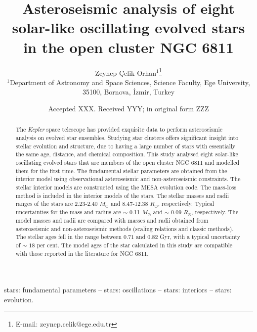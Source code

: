 \documentclass[a4paper,fleqn,usenatbib]{mnras}     %
\title[asteroseismic analysis of open cluster NGC 6811]{Asteroseismic analysis of eight solar-like oscillating evolved stars in the open cluster NGC 6811}
\author[\c{C}elik Orhan, Z.]{
Zeynep \c{C}elik Orhan$^{1}$\thanks{E-mail: zeynep.celik@ege.edu.tr}
\\
$^{1}$Department of Astronomy and Space Sciences, Science Faculty, Ege University, 35100, Bornova, \.{I}zmir, Turkey\\
}
\date{Accepted XXX. Received YYY; in original form ZZZ}
\begin{document}
\label{firstpage}
\pagerange{\pageref{firstpage}--\pageref{lastpage}}
\maketitle

\begin{abstract}
The {\emph{Kepler}} space telescope has provided exquisite data to perform asteroseismic analysis on evolved star ensembles. 
Studying star clusters offers significant insight into 
stellar evolution and structure, due to 
having a large number of 
stars with essentially the 
same age, distance, and chemical composition.
This study analysed eight solar-like oscillating evolved stars 
that are members of the open cluster NGC 6811 and 
modelled them for the first time.
The fundamental stellar parameters
are obtained from the interior model using
observational asteroseismic and non-asteroseismic constraints.
The stellar interior models are constructed using 
the {\small {MESA}} evolution code.
The mass-loss method is included in the 
interior models of the stars.
The stellar  masses and radii ranges of the stars 
are 2.23-2.40 $M_{\odot}$ and 8.47-12.38 $R_{\odot}$, respectively.
 Typical uncertainties for the mass and radius are $\sim$ 0.11  $M_{\odot}$ and $\sim$ 0.09 $R_{\odot}$, respectively.
The model masses and radii are compared with masses and radii obtained from asteroseismic and non-asteroseismic methods (scaling relations and classic methods).
The stellar ages fell in the range between $0.71$ and $0.82$ Gyr, with a typical uncertainty of $\sim$ $18$  per cent.
The model ages of the star calculated in this study 
are compatible with those reported in the literature for NGC 6811. 
\end{abstract}

\begin{keywords}
stars: fundamental parameters -- stars: oscillations -- stars: interiors -- stars: evolution.
\end{keywords}

\end{document}
